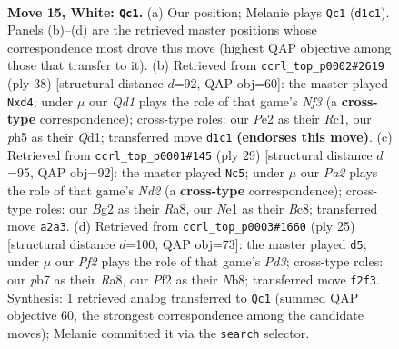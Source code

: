 \documentclass[11pt]{article}
\begin{document}
\begin{figure}[p]
\label{fig:thought-m26}
\end{figure}

\clearpage

\begin{figure}[p]\centering
\begin{subfigure}{0.46\textwidth}\centering
\resizebox{\linewidth}{!}{%
\newchessgame
\chessboard[
  setfen={r1b1kb1r/1pp5/1nn3p1/7p/p4p1q/2NP4/PP1BPPB1/R2QNRK1 w kq - 0 15},
  showmover=false,
  pgfstyle=straightmove, color=movearrow, markmove={d1-c1}
]}
\caption{}
\end{subfigure}\hfill
\begin{subfigure}{0.46\textwidth}\centering
\resizebox{\linewidth}{!}{%
\newchessgame
\chessboard[
  setfen={1r1qrbk1/1bpn1p2/3p2pp/1p5n/1P1pP3/P4N1P/1BBN1PP1/2RQR1K1 w - - 0 20},
  showmover=false,
  pgfstyle=straightmove, color=movearrow, markmove={f3-d4}
]}
\caption{}
\end{subfigure}
\\[4pt]
\begin{subfigure}{0.46\textwidth}\centering
\resizebox{\linewidth}{!}{%
\newchessgame
\chessboard[
  setfen={r1b1r1k1/1pbnqppp/2p2n2/p7/2QNP3/P1N4P/1PB2PP1/R1BR2K1 b - - 0 15},
  showmover=false,
  pgfstyle=straightmove, color=movearrow, markmove={d7-c5}
]}
\caption{}
\end{subfigure}\hfill
\begin{subfigure}{0.46\textwidth}\centering
\resizebox{\linewidth}{!}{%
\newchessgame
\chessboard[
  setfen={rn1qr1k1/3bbppp/p2p1n2/4p3/NQ2P3/1P3P2/PBP1N1PP/1K1R1B1R b - - 0 13},
  showmover=false,
  pgfstyle=straightmove, color=movearrow, markmove={d6-d5}
]}
\caption{}
\end{subfigure}
\caption{\textbf{Move 15, White: \texttt{Qc1}.} (a) Our position; Melanie plays \texttt{Qc1} (\texttt{d1c1}). Panels (b)--(d) are the retrieved master positions whose correspondence most drove this move (highest QAP objective among those that transfer to it). (b) Retrieved from \texttt{ccrl\_top\_p0002\#2619} (ply 38) [structural distance $d$=92, QAP obj=60]: the master played \texttt{Nxd4}; under $\mu$ our \emph{Qd1} plays the role of that game's \emph{Nf3} (a \textbf{cross-type} correspondence); cross-type roles: our \emph{P}e2 as their \emph{R}c1, our \emph{p}h5 as their \emph{Q}d1; transferred move \texttt{d1c1} \textbf{(endorses this move)}. (c) Retrieved from \texttt{ccrl\_top\_p0001\#145} (ply 29) [structural distance $d$=95, QAP obj=92]: the master played \texttt{Nc5}; under $\mu$ our \emph{Pa2} plays the role of that game's \emph{Nd2} (a \textbf{cross-type} correspondence); cross-type roles: our \emph{B}g2 as their \emph{R}a8, our \emph{N}e1 as their \emph{B}c8; transferred move \texttt{a2a3}. (d) Retrieved from \texttt{ccrl\_top\_p0003\#1660} (ply 25) [structural distance $d$=100, QAP obj=73]: the master played \texttt{d5}; under $\mu$ our \emph{Pf2} plays the role of that game's \emph{Pd3}; cross-type roles: our \emph{p}b7 as their \emph{R}a8, our \emph{P}f2 as their \emph{N}b8; transferred move \texttt{f2f3}. Synthesis: 1 retrieved analog transferred to \texttt{Qc1} (summed QAP objective 60, the strongest correspondence among the candidate moves); Melanie committed it via the \texttt{search} selector.}

\end{figure}
\end{document}
